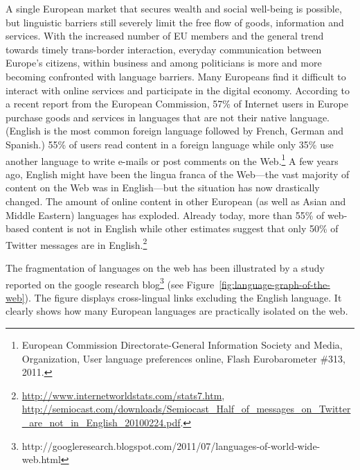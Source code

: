 \documentclass[10pt, plain]{../../metanetpaper}
\begin{document}
\begin{multicols}{2}
A single European market that secures wealth and social well-being is possible, but linguistic barriers still severely limit the free flow of goods, information and services. With the increased number of EU members and the general trend towards timely trans-border interaction, everyday communication between Europe’s citizens, within business and among politicians is more and more becoming confronted with language barriers. Many Europeans find it difficult to interact with online services and participate in the digital economy. According to a recent report from the European Commission, 57\% of Internet users in Europe purchase goods and services in languages that are not their native language. (English is the most common foreign language followed by French, German and Spanish.) 55\% of users read content in a foreign language while only 35\% use another language to write e-mails or post comments on the Web.\footnote{European Commission Directorate-General Information Society and Media, Organization, User language preferences online, Flash Eurobarometer \#313, 2011.}  A few years ago, English might have been the lingua franca of the Web—the vast majority of content on the Web was in English—but the situation has now drastically changed. The amount of online content in other European (as well as Asian and Middle Eastern) languages has exploded. Already today, more than 55\% of web-based content is not in English while other estimates suggest that only 50\% of Twitter messages are in English.\footnote{\url{http://www.internetworldstats.com/stats7.htm}, \url{http://semiocast.com/downloads/Semiocast_Half_of_messages_on_Twitter_are_not_in_English_20100224.pdf}.}

The fragmentation of languages on the web has been illustrated by a study reported on the google research blog\footnote{http://googleresearch.blogspot.com/2011/07/languages-of-world-wide-web.html} (see Figure~\ref{fig:language-graph-of-the-web}). The figure displays cross-lingual links excluding the English language. It clearly shows how many European languages are practically isolated on the web.


\end{multicols}
\end{document}
